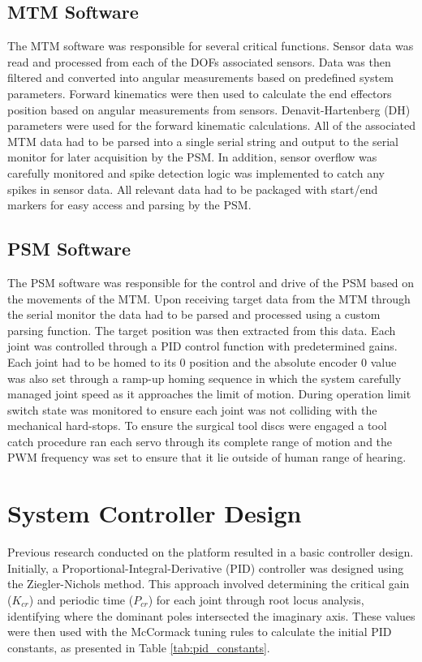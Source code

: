 \subsection{MTM Software}
The MTM software was responsible for several critical functions. Sensor data was read and processed from each of the DOFs associated sensors. Data was then filtered and converted into angular measurements based on predefined system parameters. Forward kinematics were then used to calculate the end effectors position based on angular measurements from sensors. Denavit-Hartenberg (DH) parameters were used for the forward kinematic calculations. All of the associated MTM data had to be parsed into a single serial string and output to the serial monitor for later acquisition by the PSM. In addition, sensor overflow was carefully monitored and spike detection logic was implemented to catch any spikes in sensor data. All relevant data had to be packaged with start/end markers for easy access and parsing by the PSM.


\subsection{PSM Software}
The PSM software was responsible for the control and drive of the PSM based on the movements of the MTM. Upon receiving target data from the MTM through the serial monitor the data had to be parsed and processed using a custom parsing function. The target position was then extracted from this data. Each joint was controlled through a PID control function with predetermined gains. Each joint had to be homed to its 0 position and the absolute encoder 0 value was also set through a ramp-up homing sequence in which the system carefully managed joint speed as it approaches the limit of motion.
During operation limit switch state was monitored to ensure each joint was not colliding with the mechanical hard-stops. To ensure the surgical tool discs were engaged a tool catch procedure ran each servo through its complete range of motion and the PWM frequency was set to ensure that it lie outside of human range of hearing.

\section{System Controller Design}

Previous research conducted on the platform resulted in a basic controller design. Initially, a Proportional-Integral-Derivative (PID) controller was designed using the Ziegler-Nichols method. This approach involved determining the critical gain ($K_{cr}$) and periodic time ($P_{cr}$) for each joint through root locus analysis, identifying where the dominant poles intersected the imaginary axis. These values were then used with the McCormack tuning rules to calculate the initial PID constants, as presented in Table \ref{tab:pid_constants}.

